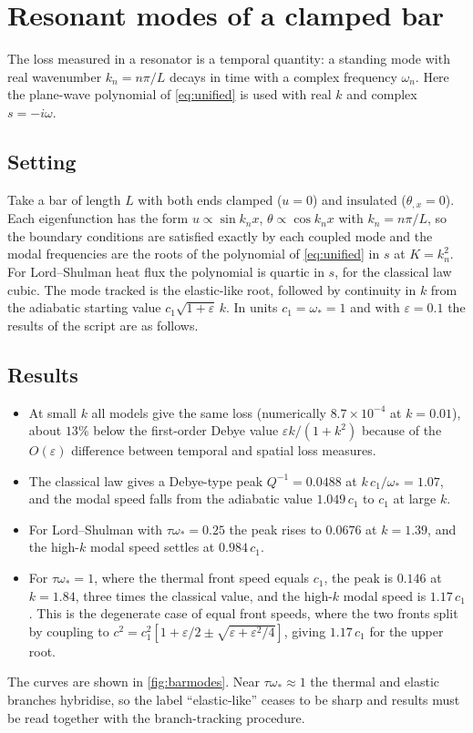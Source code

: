 \section{Resonant modes of a clamped bar}\label{sec:bar}

The loss measured in a resonator is a temporal quantity: a standing mode with real wavenumber $k_n=n\pi/L$ decays in time with a complex frequency $\omega_n$. Here the plane-wave polynomial of \cref{eq:unified} is used with real $k$ and complex $s=-i\omega$.

\subsection{Setting}
Take a bar of length $L$ with both ends clamped ($u=0$) and insulated ($\theta_{,x}=0$). Each eigenfunction has the form $u\propto\sin k_nx$, $\theta\propto\cos k_nx$ with $k_n=n\pi/L$, so the boundary conditions are satisfied exactly by each coupled mode and the modal frequencies are the roots of the polynomial of \cref{eq:unified} in $s$ at $K=k_n^2$. For Lord--Shulman heat flux the polynomial is quartic in $s$, for the classical law cubic. The mode tracked is the elastic-like root, followed by continuity in $k$ from the adiabatic starting value $c_1\sqrt{1+\varepsilon}\,k$. In units $c_1=\omega_*=1$ and with $\varepsilon=0.1$ the results of the script  are as follows.

\subsection{Results}
\begin{itemize}
\item At small $k$ all models give the same loss (numerically $8.7\times10^{-4}$ at $k=0.01$), about $13\%$ below the first-order Debye value $\varepsilon k/(1+k^2)$ because of the $O(\varepsilon)$ difference between temporal and spatial loss measures.
\item The classical law gives a Debye-type peak $Q^{-1}=0.0488$ at $k\,c_1/\omega_*=1.07$, and the modal speed falls from the adiabatic value $1.049\,c_1$ to $c_1$ at large $k$.
\item For Lord--Shulman with $\tau\omega_*=0.25$ the peak rises to $0.0676$ at $k=1.39$, and the high-$k$ modal speed settles at $0.984\,c_1$.
\item For $\tau\omega_*=1$, where the thermal front speed equals $c_1$, the peak is $0.146$ at $k=1.84$, three times the classical value, and the high-$k$ modal speed is $1.17\,c_1$. This is the degenerate case of equal front speeds, where the two fronts split by coupling to $c^2=c_1^2[1+\varepsilon/2\pm\sqrt{\varepsilon+\varepsilon^2/4}]$, giving $1.17\,c_1$ for the upper root.
\end{itemize}
The curves are shown in \cref{fig:barmodes}. Near $\tau\omega_*\approx1$ the thermal and elastic branches hybridise, so the label ``elastic-like'' ceases to be sharp and results must be read together with the branch-tracking procedure.

